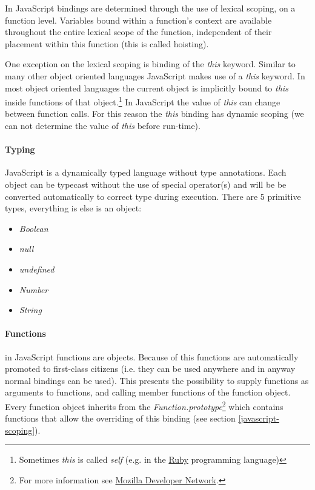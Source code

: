 In JavaScript bindings are determined through the use of lexical scoping, on a function level. Variables bound within a function's context are available throughout the entire lexical scope of the function, independent of their placement within this function (this is called hoisting).

One exception on the lexical scoping is binding of the \textit{this} keyword. Similar to many other object oriented languages JavaScript makes use of a \textit{this} keyword. In most object oriented languages the current object is implicitly bound to \textit{this} inside functions of that object.\footnote{Sometimes \textit{this} is called \textit{self} (e.g. in the \href{http://ruby.org}{Ruby} programming language)} In JavaScript the value of \textit{this} can change between function calls. For this reason the \textit{this} binding has dynamic scoping (we can not determine the value of \textit{this} before run-time).

\paragraph{Typing} \label{javascript-typing}
JavaScript is a dynamically typed language without type annotations. Each object can be typecast without the use of special operator(s) and will be be converted automatically to correct type during execution. There are 5 primitive types, everything is else is an object:

\begin{itemize}
	\item \textit{Boolean}
	\item \textit{null}
	\item \textit{undefined}
	\item \textit{Number}
	\item \textit{String}
\end{itemize}

\paragraph{Functions} \label{javascript-functions}
in JavaScript functions are objects. Because of this functions are automatically promoted to first-class citizens (i.e. they can be used anywhere and in anyway normal bindings can be used). This presents the possibility to supply functions as arguments to functions, and calling member functions of the function object. Every function object inherits from the \textit{Function.prototype}\footnote{For more information see \href{https://developer.mozilla.org/en-US/docs/Web/JavaScript/Reference/Global_Objects/Function/prototype}{Mozilla Developer Network}.} which contains functions that allow the overriding of this binding (see section \ref{javascript-scoping}).

